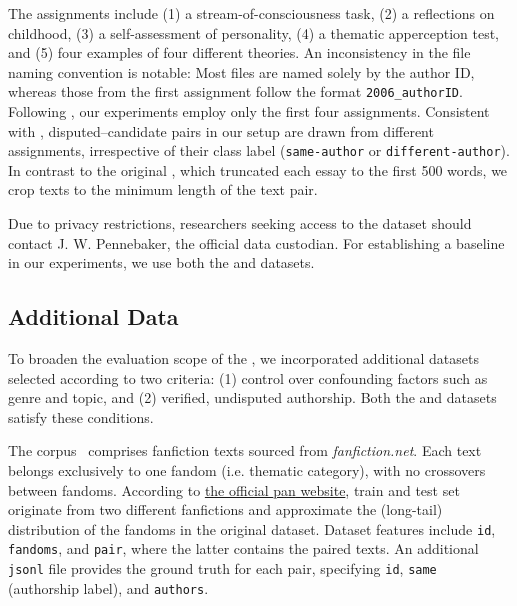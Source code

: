 The assignments include (1) a stream-of-consciousness task, (2) a reflections on childhood, (3) a self-assessment of personality, (4) a thematic apperception test, and (5) four examples of four different theories.
An inconsistency in the file naming convention is notable: 
Most files are named solely by the author ID, whereas those from the first assignment follow the format \texttt{2006\_authorID}.
Following \citet{koppel_determining_2014}, our \impAppr{} experiments employ only the first four assignments. 
Consistent with \citet{koppel_determining_2014}, disputed–candidate pairs in our setup are drawn from different assignments, irrespective of their class label (\texttt{same-author} or \texttt{different-author}).
In contrast to the original \impAppr{}, which truncated each essay to the first 500 words, we crop texts to the minimum length of the text pair.

Due to privacy restrictions, researchers seeking access to the \dataStudent{} dataset should contact J. W. Pennebaker, the official data custodian. 
For establishing a baseline in our \imp{} experiments, we use both the \dataBlog{} and \dataStudent{} datasets.


\subsection{Additional Data}
\label{subsec:additional_data}
To broaden the evaluation scope of the \impAppr{}, we incorporated additional datasets selected according to two criteria:
(1) control over confounding factors such as genre and topic, and 
(2) verified, undisputed authorship.
Both the \dataPan{} and \dataGutenberg{} datasets satisfy these conditions.

The \dataPan{} corpus~\citep{bischoff_importance_2020} comprises fanfiction texts sourced from \textit{fanfiction.net}.
Each text belongs exclusively to one fandom (i.e. thematic category), with no crossovers between fandoms.
According to \href{https://pan.webis.de/clef20/pan20-web/author-identification.html}{the official \ac{pan} website}, 
train and test set originate from two different fanfictions and approximate the (long-tail) distribution of the fandoms in the original dataset.
Dataset features include \texttt{id}, \texttt{fandoms}, and \texttt{pair}, where the latter contains the paired texts.
An additional \texttt{jsonl} file provides the ground truth for each pair, specifying \texttt{id}, \texttt{same} (authorship label), and \texttt{authors}.

